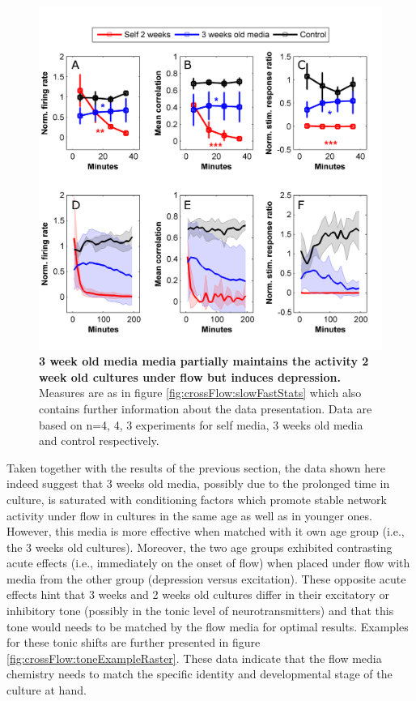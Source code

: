         \begin{figure}[!htb]
            \centering
            \includegraphics[width=15cm]{chapter5/figures/oldOnYoung/oldOnYoung.jpg}
            \caption[Averaged time course of activity measures in young cultures under flow with old media]{\textbf{3 week old media media partially maintains the activity 2 week old cultures under flow but induces depression.} Measures are as in figure \ref{fig:crossFlow:slowFastStats} which also contains further information about the data presentation. Data are based on n=4, 4, 3 experiments for self media, 3 weeks old media and control respectively.}
            \label{fig:crossFlow:oldOnYoungStats}
        \end{figure}


        Taken together with the results of the previous section, the data shown here indeed suggest that 3 weeks old media, possibly due to the prolonged time in culture, is saturated with conditioning factors which promote stable network activity under flow in cultures in the same age as well as in younger ones. However, this media is more effective when matched with it own age group (i.e., the 3 weeks old cultures). Moreover, the two age groups exhibited contrasting acute effects (i.e., immediately on the onset of flow) when placed under flow with media from the other group (depression versus excitation). These opposite acute effects hint that 3 weeks and 2 weeks old cultures differ in their excitatory or inhibitory tone (possibly in the tonic level of neurotransmitters) and that this tone would needs to be matched by the flow media for optimal results. Examples for these tonic shifts are further presented in figure \ref{fig:crossFlow:toneExampleRaster}. These data indicate that the flow media chemistry needs to match the specific identity and developmental stage of the culture at hand.


